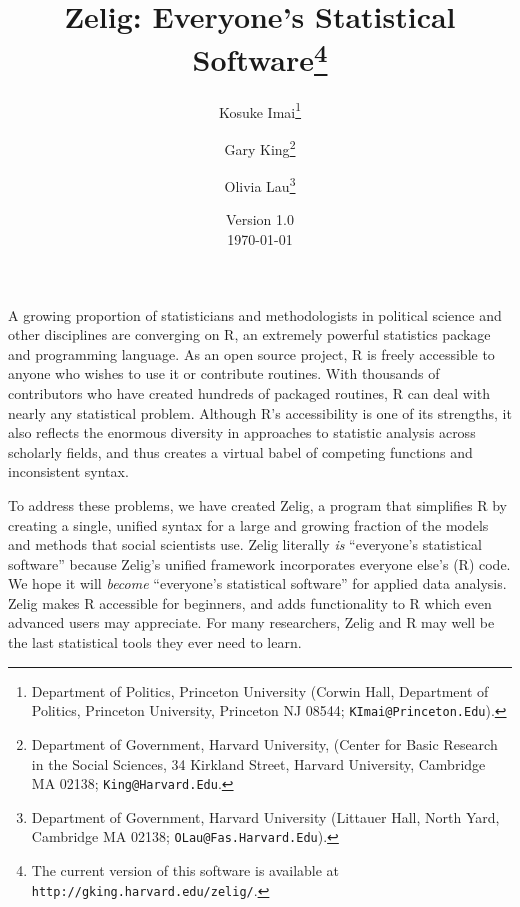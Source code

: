 \documentclass[12pt]{article}
\title{Zelig: Everyone's Statistical Software\thanks{The current
    version of this software is available at
    \texttt{http://gking.harvard.edu/zelig/}.}}
\author{Kosuke
  Imai\thanks{Department of Politics, Princeton
  University (Corwin Hall, Department of Politics, Princeton
  University, Princeton NJ 08544; \texttt{KImai@Princeton.Edu}).}
\and %
Gary King\thanks{Department of Government, Harvard
  University, (Center for Basic Research in the Social Sciences, 34
  Kirkland Street, Harvard University, Cambridge MA 02138; \texttt{King@Harvard.Edu}.}
\and %
Olivia Lau\thanks{Department of Government, Harvard University (Littauer Hall, North Yard, Cambridge MA 02138;
  \texttt{OLau@Fas.Harvard.Edu}).}}
\date{Version 1.0 \\\today}
\begin{document}
\maketitle

A growing proportion of statisticians and methodologists in political
science and other disciplines are converging on R, an extremely
powerful statistics package and programming language.  As an open
source project, R is freely accessible to anyone who wishes to use it
or contribute routines.  With thousands of contributors who have
created hundreds of packaged routines, R can deal with nearly any
statistical problem.  Although R's accessibility is one of its
strengths, it also reflects the enormous diversity in approaches to
statistic analysis across scholarly fields, and thus creates a virtual
babel of competing functions and inconsistent syntax.

To address these problems, we have created Zelig, a program that
simplifies R by creating a single, unified syntax for a large and
growing fraction of the models and methods that social scientists use.
Zelig literally \emph{is} ``everyone's statistical software'' because
Zelig's unified framework incorporates everyone else's (R) code.  We
hope it will \emph{become} ``everyone's statistical software'' for
applied data analysis.  Zelig makes R accessible for beginners, and
adds functionality to R which even advanced users may appreciate.
For many researchers, Zelig and R may well be the last statistical
tools they ever need to learn.
\end{document}
